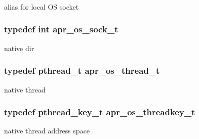 \subsubsection[{\texorpdfstring{apr\+\_\+os\+\_\+sock\+\_\+info\+\_\+t}{apr_os_sock_info_t}}]{}\hypertarget{group__apr__portabile_gaece2b8b41cbb949590896b47daaa9fd2}{}\label{group__apr__portabile_gaece2b8b41cbb949590896b47daaa9fd2}


alias for local OS socket 

\subsubsection[{\texorpdfstring{apr\+\_\+os\+\_\+sock\+\_\+t}{apr_os_sock_t}}]{\setlength{\rightskip}{0pt plus 5cm}typedef {\bf int} {\bf apr\+\_\+os\+\_\+sock\+\_\+t}}\hypertarget{group__apr__portabile_ga2965cd2e48cb6513bc0ba05aa6083ed7}{}\label{group__apr__portabile_ga2965cd2e48cb6513bc0ba05aa6083ed7}
native dir 
\subsubsection[{\texorpdfstring{apr\+\_\+os\+\_\+thread\+\_\+t}{apr_os_thread_t}}]{\setlength{\rightskip}{0pt plus 5cm}typedef pthread\+\_\+t {\bf apr\+\_\+os\+\_\+thread\+\_\+t}}\hypertarget{group__apr__portabile_ga4ccd9519af148ccf9cff850dd58f00b6}{}\label{group__apr__portabile_ga4ccd9519af148ccf9cff850dd58f00b6}
native thread 
\subsubsection[{\texorpdfstring{apr\+\_\+os\+\_\+threadkey\+\_\+t}{apr_os_threadkey_t}}]{\setlength{\rightskip}{0pt plus 5cm}typedef pthread\+\_\+key\+\_\+t {\bf apr\+\_\+os\+\_\+threadkey\+\_\+t}}\hypertarget{group__apr__portabile_ga0a228496d8a1a9b3be744ddb101a3e76}{}\label{group__apr__portabile_ga0a228496d8a1a9b3be744ddb101a3e76}
native thread address space 

